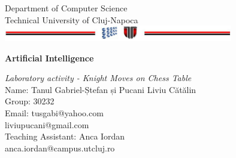 \documentclass[a4paper,12pt]{report}
\begin{document}
\vspace{-5cm}
\begin{center}
Department of Computer Science\\
Technical University of Cluj-Napoca\\
\includegraphics[width=10cm]{fig/footer}
\end{center}
\vspace{1cm}
\begin{center}
\begin{Large}
 \textbf{Artificial Intelligence}\\
\end{Large}
\textit{Laboratory activity - Knight Moves on Chess Table}\\
\vspace{3cm}
Name: Tanul Gabriel-Ștefan și Pucani Liviu Cătălin\\
Group: 30232\\
Email: tus\underline{\hspace{.1in}}gabi@yahoo.com \\
       \hspace{1.70cm}liviupucani@gmail.com\\
\vspace{12cm}
Teaching Assistant: Anca Iordan\\
anca.iordan@campus.utcluj.ro\\
\vspace{1cm}


  
 
\end{center}

\tableofcontents

\end{document}
